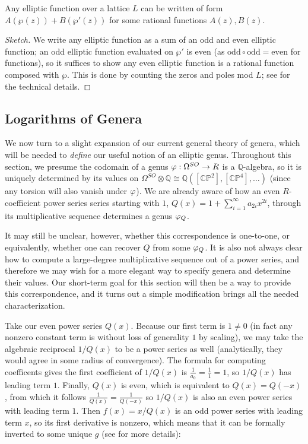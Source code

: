 \begin{theorem}
    Any elliptic function over a lattice $L$ can be written of form $A(\wp(z)) + B( \wp '(z))$ for some rational functions $A(z), B(z)$. 
\end{theorem}

\begin{proof}[Sketch]
    We write any elliptic function as a sum of an odd and even elliptic function; an odd elliptic function evaluated on $\wp'$ is even (as $\text{odd} \circ \text{odd} = \text{even}$ for functions), so it suffices to show any even elliptic function is a rational function composed with $\wp$. This is done by counting the zeros and poles mod $L$; see \cite{Lang_1987} for the technical details.
\end{proof}



\subsection{Logarithms of Genera}
We now turn to a slight expansion of our current general theory of genera, which will be needed to \textit{define} our useful notion of an elliptic genus. Throughout this section, we presume the codomain of a genus $\varphi: \Omega^{SO} \to R$ is a $\mathbb{Q}$-algebra, so it is uniquely determined by its values on $\Omega^{SO} \otimes \mathbb{Q}\cong \mathbb{Q}( [\mathbb{CP}^2], [\mathbb{CP}^4], \dots )$ (since any torsion will also vanish under $\varphi$). We are already aware of how an even $R$-coefficient power series series starting with $1$, $Q(x) = 1 + \sum_{i=1}^\infty a_{2i} x^{2i}$, through its multiplicative sequence determines a genus $\varphi_Q$. 

It may still be unclear, however, whether this correspondence is one-to-one, or equivalently, whether one can recover $Q$ from some $\varphi_Q$. It is also not always  clear how to compute a large-degree multiplicative sequence out of a power series, and therefore we may wish for a more elegant way to specify genera and determine their values. Our short-term goal for this section will then be a way to provide this correspondence, and it turns out a simple modification brings all the needed characterization.

Take our even power series $Q(x)$. Because our first term is $1 \neq 0$ (in fact any nonzero constant term is without loss of generality $1$ by scaling), we may take the algebraic reciprocal $1/Q(x)$ to be a power series as well (analytically, they would agree in some radius of convergence). The formula for computing coefficents gives the first coefficient of $1/Q(x) $ is $\frac{1}{a_0} = \frac{1}{1} = 1$, so $1/Q(x)$ has leading term $1$. Finally, $Q(x)$ is even, which is equivalent to $Q(x) = Q(-x)$, from which it follows $\frac{1}{Q(x)} = \frac{1}{Q(-x)}$ so $1/Q(x)$ is also an even power series with leading term $1$. Then $f(x) = x/ Q(x)$ is an odd power series with leading term $x$, so its first derivative is nonzero, which means that it can be formally inverted to some unique $g$ (see \cite{Niven_1969} for more details):

